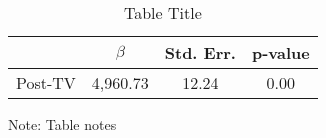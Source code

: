 \noindent 
\begin{table}[H]
\caption{Table Title\label{tab:regression}}
\medskip{}

\begin{centering}
\begin{tabular}{cccc}
\hline 
 & $\beta$ & Std. Err. & p-value\tabularnewline
\hline 
Post-TV & 4,960.73 & 12.24 & 0.00\tabularnewline
\hline 
\end{tabular}
\par\end{centering}
\begin{centering}
\medskip{}
\par\end{centering}
{\footnotesize{}Note: Table notes}{\footnotesize\par}
\end{table}

